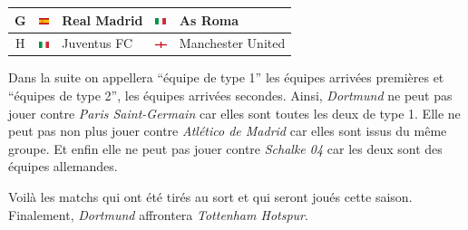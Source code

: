 \documentclass{../ficheTDTP}
\begin{document}
\begin{tabular}{|c|ll|ll|}
G & \includegraphics[height=0.2cm]{flags/es.png} & Real Madrid & \includegraphics[height=0.2cm]{flags/it.png} & As Roma \\ \hline
H & \includegraphics[height=0.2cm]{flags/it.png} & Juventus FC & \includegraphics[height=0.2cm]{flags/en.png} & Manchester United \\ \hline
\end{tabular}

\vspace{0.5cm}

Dans la suite on appellera ``équipe de type 1'' les équipes arrivées premières et ``équipes de type 2'', les équipes arrivées secondes. Ainsi, \textit{Dortmund} ne peut pas jouer contre \textit{Paris Saint-Germain} car elles sont toutes les deux de type 1. Elle ne peut pas non plus jouer contre \textit{Atlético de Madrid} car elles sont issus du même groupe. Et enfin elle ne peut pas jouer contre \textit{Schalke 04} car les deux sont des équipes allemandes. 

Voilà les matchs qui ont été tirés au sort et qui seront joués cette saison. Finalement, \textit{Dortmund} affrontera \textit{Tottenham Hotspur}. 

\vspace{0.5cm}
\end{document}
